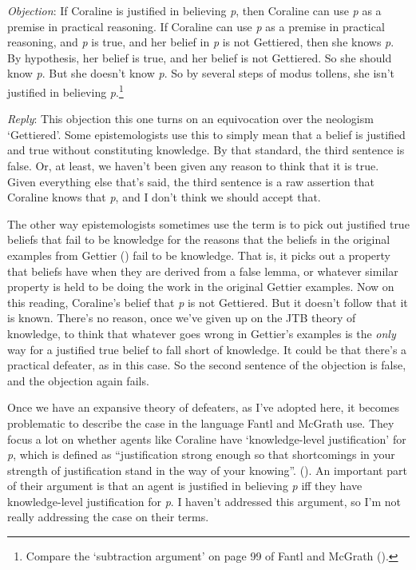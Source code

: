\documentclass[
  11pt,
  letterpaper,
  DIV=11,
  numbers=noendperiod,
  twoside]{scrartcl}
\begin{document}
\emph{Objection}: If Coraline is justified in believing \emph{p}, then
Coraline can use \emph{p} as a premise in practical reasoning. If
Coraline can use \emph{p} as a premise in practical reasoning, and
\emph{p} is true, and her belief in \emph{p} is not Gettiered, then she
knows \emph{p}. By hypothesis, her belief is true, and her belief is not
Gettiered. So she should know \emph{p}. But she doesn't know \emph{p}.
So by several steps of modus tollens, she isn't justified in believing
\emph{p}.\footnote{Compare the `subtraction argument' on page 99 of
  Fantl and McGrath ().}

\emph{Reply}: This objection this one turns on an equivocation over the
neologism `Gettiered'. Some epistemologists use this to simply mean that
a belief is justified and true without constituting knowledge. By that
standard, the third sentence is false. Or, at least, we haven't been
given any reason to think that it is true. Given everything else that's
said, the third sentence is a raw assertion that Coraline knows that
\emph{p}, and I don't think we should accept that.

The other way epistemologists sometimes use the term is to pick out
justified true beliefs that fail to be knowledge for the reasons that
the beliefs in the original examples from Gettier
() fail to be knowledge. That is, it
picks out a property that beliefs have when they are derived from a
false lemma, or whatever similar property is held to be doing the work
in the original Gettier examples. Now on this reading, Coraline's belief
that \emph{p} is not Gettiered. But it doesn't follow that it is known.
There's no reason, once we've given up on the JTB theory of knowledge,
to think that whatever goes wrong in Gettier's examples is the
\emph{only} way for a justified true belief to fall short of knowledge.
It could be that there's a practical defeater, as in this case. So the
second sentence of the objection is false, and the objection again
fails.

Once we have an expansive theory of defeaters, as I've adopted here, it
becomes problematic to describe the case in the language Fantl and
McGrath use. They focus a lot on whether agents like Coraline have
`knowledge-level justification' for \emph{p}, which is defined as
``justification strong enough so that shortcomings in your strength of
justification stand in the way of your knowing''.
(). An
important part of their argument is that an agent is justified in
believing \emph{p} iff they have knowledge-level justification for
\emph{p}. I haven't addressed this argument, so I'm not really
addressing the case on their terms.
\end{document}

